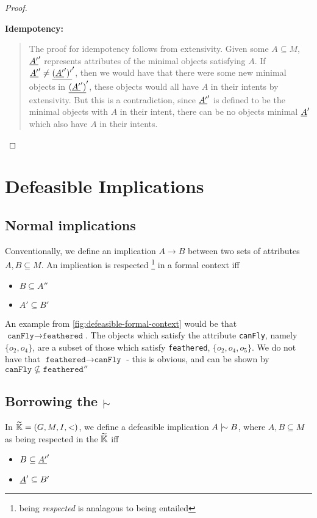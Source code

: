 \documentclass[11pt]{article}
\begin{document}
\begin{proof}
\begin{quotation}
  \end{quotation}

  \textbf{Idempotency:}
  \begin{quotation}
    \noindent The proof for idempotency follows from extensivity. Given some $A \subseteq M$, $\underline{A'}'$ represents attributes of the minimal objects satisfying $A$. If $\underline{A'}' \not =\underline{(\underline{A'}')'}'$, then we would have that there were some new minimal objects in $\underline{(\underline{A'}')}'$, these objects would all have $A$ in their intents by extensivity. But this is a contradiction, since $\underline{A'}'$ is defined to be the minimal objects with $A$ in their intent, there can be no objects minimal $\underline{A}'$ which also have $A$ in their intents.
  \end{quotation}
\end{proof}

\clearpage
\section{Defeasible Implications}
\subsection{Normal implications}
Conventionally, we define an implication $A\rightarrow B$ between two sets of attributes $A,B \subseteq M$. An implication is respected \footnote{being \textit{respected} is analagous to being entailed} in a formal context iff

\begin{itemize}
  \item $B \subseteq A''$
  \item $A' \subseteq B'$
\end{itemize}

An example from \autoref{fig:defeasible-formal-context} would be that $\texttt{canFly} \rightarrow \texttt{feathered}$. The objects which satisfy the attribute \texttt{canFly}, namely $\{o_2, o_4\}$, are a subset of those which satisfy \texttt{feathered}, $\{o_2, o_4, o_5\}$. We do not have that $\texttt{feathered} \rightarrow \texttt{canFly}$ - this is obvious, and can be shown by $\texttt{canFly} \not \subseteq \texttt{feathered}''$

\subsection{Borrowing the $\twiddle$}
In $\widetilde{\mathbb{K}} = (G,M,I, <)$, we define a defeasible implication $A \twiddle B$, where $A,B \subseteq M$ as being respected in the $\widetilde{\mathbb{K}}$ iff
\begin{itemize}
  \item $B \subseteq \underline{A'}'$
  \item $\underline{A}' \subseteq B'$
\end{itemize}
\end{document}
